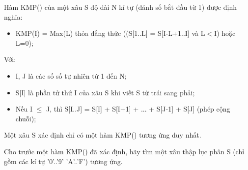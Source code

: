 Hàm KMP() của một xâu S độ dài N kí tự (đánh số bắt đầu từ 1) được định nghĩa:  
\begin{itemize}
	\item     KMP(I) = Max(L) thỏa đẳng thức ((S[1..L] = S[I-L+1..I] và L$<$I) hoặc L=0);   
\end{itemize}

   Với:  
\begin{itemize}
	\item     I, J là các số số tự nhiên từ 1 đến N;   
	\item     S[I] là phần tử thứ I của xâu S khi viết S từ trái sang phải;   
	\item     Nếu I $\le$ J, thì S[I..J] = S[I] + S[I+1] + ... + S[J-1] + S[J] (phép cộng chuỗi);   
\end{itemize}

   Một xâu S xác định chỉ có một hàm KMP() tương ứng duy nhất.  

   Cho trước một hàm KMP() đã xác định, hãy tìm một xâu thập lục phân S (chỉ gồm các kí tự '0'..'9' 'A'..'F') tương ứng.